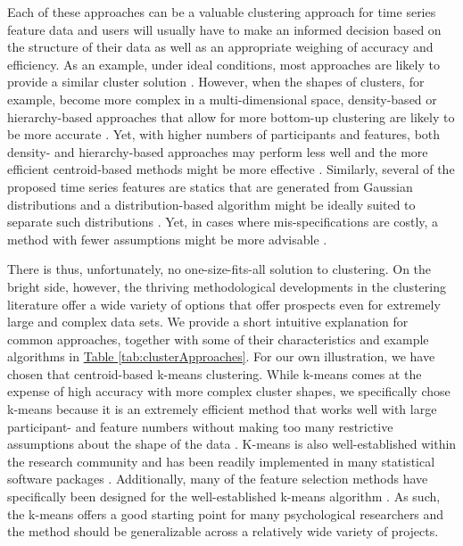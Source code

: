 \documentclass[man, 12pt, a4paper, mask, floatsintext]{apa7}
\theoremstyle{break}
\theoremstyle{plain}
\newcommand{\tblref}[2][]{\hyperref[#2]{Table \ref*{#2}#1}}
\begin{document}
Each of these approaches can be a valuable clustering approach for time series feature data and users will usually have to make an informed decision based on the structure of their data as well as an appropriate weighing of accuracy and efficiency. As an example, under ideal conditions, most approaches are likely to provide a similar cluster solution \citep[e.g., for well seprated groups with little noice and few outliers; e.g., see][]{peng2022}. However, when the shapes of clusters, for example, become more complex in a multi-dimensional space, density-based or hierarchy-based approaches that allow for more bottom-up clustering are likely to be more accurate \citep[e.g.,][]{langfelder2008}. Yet, with higher numbers of participants and features, both density- and hierarchy-based approaches may perform less well and the more efficient centroid-based methods might be more effective \citep[e.g.,][]{jain2010}. Similarly, several of the proposed time series features are statics that are generated from Gaussian distributions and a distribution-based algorithm might be ideally suited to separate such distributions \citep[e.g.,][]{corduas2008}. Yet, in cases where mis-specifications are costly, a method with fewer assumptions might be more advisable \citep[e.g.,][]{ankerst1999}. 

There is thus, unfortunately, no one-size-fits-all solution to clustering. On the bright side, however, the thriving methodological developments in the clustering literature offer a wide variety of options that offer prospects even for extremely large and complex data sets. We provide a short intuitive explanation for common approaches, together with some of their characteristics and example algorithms in \tblref{tab:clusterApproaches}. For our own illustration, we have chosen that centroid-based k-means clustering. While k-means comes at the expense of high accuracy with more complex cluster shapes, we specifically chose k-means because it is an extremely efficient method that works well with large participant- and feature numbers without making too many restrictive assumptions about the shape of the data \citep{jain2010}. K-means is also well-established within the research community and has been readily implemented in many statistical software packages \citep{hand2005}. Additionally, many of the feature selection methods have specifically been designed for the well-established k-means algorithm \citep[e.g.,][]{boutsidis2010}. As such, the k-means offers a good starting point for many psychological researchers and the method should be generalizable across a relatively wide variety of projects.
\end{document}
